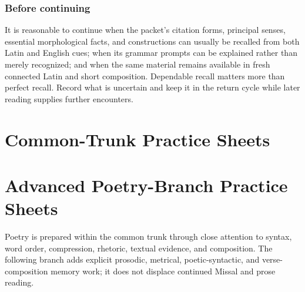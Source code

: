 \section{Before continuing}

It is reasonable to continue when the packet's citation forms, principal
senses, essential morphological facts, and constructions can usually be
recalled from both Latin and English cues; when its grammar prompts can be
explained rather than merely recognized; and when the same material remains
available in fresh connected Latin and short composition.  Dependable recall
matters more than perfect recall.  Record what is uncertain and keep it in the
return cycle while later reading supplies further encounters.

\part{Common-Trunk Practice Sheets}


\part{Advanced Poetry-Branch Practice Sheets}

Poetry is prepared within the common trunk through close attention to syntax,
word order, compression, rhetoric, textual evidence, and composition.  The
following branch adds explicit prosodic, metrical, poetic-syntactic, and verse-
composition memory work; it does not displace continued Missal and prose
reading.


